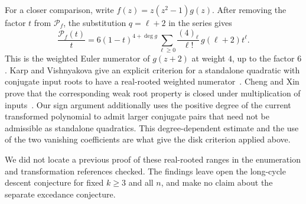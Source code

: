 \documentclass[11pt]{article}
\newcommand{\PP}{\mathcal P}
\begin{document}
For a closer comparison, write $f(z)=z(z^2-1)g(z)$. After removing
the factor $t$ from $\PP_f$, the substitution $q=\ell+2$ in the series
gives
\[
\frac{\PP_f(t)}{t}
 =6(1-t)^{4+\deg g}\sum_{\ell\ge0}\frac{(4)_\ell}{\ell!}\,
     g(\ell+2)t^\ell .
\]
This is the weighted Euler numerator of $g(z+2)$ at weight $4$,
up to the factor $6$. Karp and Vishnyakova give an explicit
criterion for a standalone quadratic with conjugate input roots
to have a real-rooted weighted numerator~\cite[\S2]{KV}. Cheng and
Xin prove that the corresponding weak root property is closed under
multiplication of inputs~\cite[Theorem 1.1]{CX}. Our sign argument
additionally uses the positive degree of the current transformed
polynomial to admit larger conjugate pairs that need not be
admissible as standalone quadratics. This degree-dependent estimate
and the use of the two vanishing coefficients are what give the
disk criterion applied above.

We did
not locate a previous proof of these real-rooted ranges in the
enumeration and transformation references checked. The findings
leave open the long-cycle descent conjecture for fixed $k\ge3$ and
all $n$, and make no claim about the separate excedance conjecture.
\end{document}
